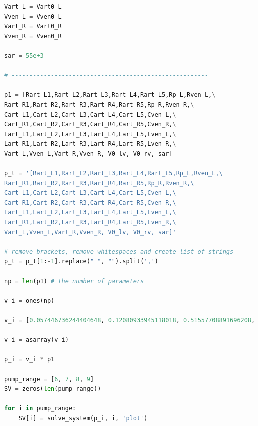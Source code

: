 \begin{lstlisting}[language=Python,caption={Математическая модель сердечно-сосудистой системы на языке программирования Python},label={list:cardiovascular_system_model}]
Vart_L = Vart0_L
Vven_L = Vven0_L
Vart_R = Vart0_R
Vven_R = Vven0_R

sar = 55e+3

# -------------------------------------------------------

p1 = [Rart_L1,Rart_L2,Rart_L3,Rart_L4,Rart_L5,Rp_L,Rven_L,\
Rart_R1,Rart_R2,Rart_R3,Rart_R4,Rart_R5,Rp_R,Rven_R,\
Cart_L1,Cart_L2,Cart_L3,Cart_L4,Cart_L5,Cven_L,\
Cart_R1,Cart_R2,Cart_R3,Cart_R4,Cart_R5,Cven_R,\
Lart_L1,Lart_L2,Lart_L3,Lart_L4,Lart_L5,Lven_L,\
Lart_R1,Lart_R2,Lart_R3,Lart_R4,Lart_R5,Lven_R,\
Vart_L,Vven_L,Vart_R,Vven_R, V0_lv, V0_rv, sar]

p_t = '[Rart_L1,Rart_L2,Rart_L3,Rart_L4,Rart_L5,Rp_L,Rven_L,\
Rart_R1,Rart_R2,Rart_R3,Rart_R4,Rart_R5,Rp_R,Rven_R,\
Cart_L1,Cart_L2,Cart_L3,Cart_L4,Cart_L5,Cven_L,\
Cart_R1,Cart_R2,Cart_R3,Cart_R4,Cart_R5,Cven_R,\
Lart_L1,Lart_L2,Lart_L3,Lart_L4,Lart_L5,Lven_L,\
Lart_R1,Lart_R2,Lart_R3,Lart_R4,Lart_R5,Lven_R,\
Vart_L,Vven_L,Vart_R,Vven_R, V0_lv, V0_rv, sar]'

# remove brackets, remove whitespaces and create list of strings
p_t = p_t[1:-1].replace(" ", "").split(',')

np = len(p1) # the number of parameters

v_i = ones(np)

v_i = [0.057446736244404648, 0.12080933945118018, 0.51557708891696208, 1.0357810417699811, 1.060271287869758, 0.84033406019046764, 0.30211326841133845, 0.21310613995095165, 0.28955931531899554, 0.46145435968383813, 0.77440484756234174, 0.9465264404862892, 0.95668625287711806, 0.54134565361527442, 0.85805787525000099, 1.0185616722139288, 1.0003993443727075, 0.93119579177555656, 0.81353258908257642, 1.7442397377132861, 1.2984777917739705, 1.2124190153201915, 1.165212717326739, 1.0444143773590948, 1.6669876819908915, 0.15794521328188671, 1.0586296178272783, 1.0207537648275333, 1.0004906844321702, 0.99990051530687607, 1.0610305975475545, 0.99499515994055321, 0.95463450949954864, 0.98104894253495512, 1.0109392395422161, 0.99701385664672226, 0.89860960809029089, 1.0071528389304678, 1.0, 1.0276885369762943, 1.0, 0.98934551877122834, 4.544365928991331, 3.3669363110489434, 0.87559079878157575]

v_i = asarray(v_i)

p_i = v_i * p1

pump_range = [6, 7, 8, 9]
SV = zeros(len(pump_range))

for i in pump_range:
	SV[i] = solve_system(p_i, i, 'plot')

\end{lstlisting}

